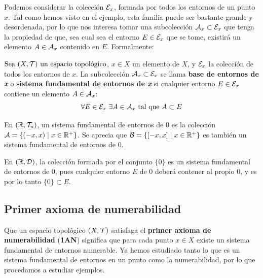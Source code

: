 Podemos considerar la colección $\cE_x$, formada por todos los entornos de un punto $x$. Tal como hemos visto en el ejemplo, esta familia puede ser bastante grande y desordenada, por lo que nos interesa tomar una subcolección $\cA_x \subset \cE_x$ que tenga la propiedad de que, sea cual sea el entorno $E\in \cE_x$ que se tome, existirá un elemento $A\in \cA_x$ contenido en $E$. Formalmente:

\hypertarget{def:base_de_entornos}{}
\begin{deff}
    $\seatop$, $x\in X$ un elemento de $X$, y $\cE_x$ la colección de todos los entornos de $x$. La subcolección $\cA_x \subset \cE_x$ se llama {\bf base de entornos de {\it \textbf{x}}} o {\bf sistema fundamental de entornos de {\it \textbf{x}}} si cualquier entorno $E\in\cE_x$ contiene un elemento $A\in\cA_x$:
    \[\forall E \in \cE_x \ \exists A\in\cA_x \text{ tal que } A \subset E\]
\end{deff}

\begin{ejs}
    \item En $\topusu$, un sistema fundamental de entornos de $0$ es la colección $\cA = \{(-x,x) \mid x \in \R^+\}$. Se aprecia que $\cB = \{[-x,x] \mid x \in \R^+\}$ es también un sistema fundamental de entornos de $0$.
    \item En $(\R, \cD)$, la colección formada por el conjunto $\{0\}$ es un sistema fundamental de entornos de $0$, pues cualquier entorno $E$ de $0$ deberá contener al propio $0$, y es por lo tanto $\{0\}\subset E$.
\end{ejs}

\subsection*{Primer axioma de numerabilidad}

Que un espacio topológico $(X,\cT)$ satisfaga el {\bf primer axioma de numerabilidad} ({\bf 1AN}) significa que para cada punto $x\in X$ existe un sistema fundamental de entornos numerable. Ya hemos estudiado tanto lo que es un sistema fundamental de entornos en un punto como la numerabilidad, por lo que procedamos a estudiar ejemplos.

